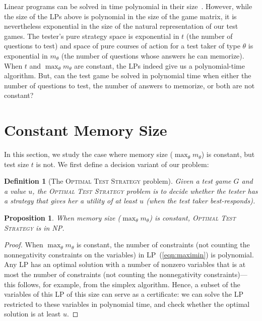 \documentclass{article}
\newtheorem{definition}{Definition}
\newtheorem{proposition}{Proposition}
\begin{document}
Linear programs can be solved in time polynomial in their
size~\cite{Khachiyan79}.
However, while the size of the LPs above is polynomial in the size of the
game matrix, it is nevertheless exponential in the size of the natural
representation of our test games.
The tester's pure strategy space is exponential in $t$ (the number of
questions to test) and space of pure courses of action for a test taker of
type $\theta$ is exponential in $m_\theta$ (the number of questions whose
answers he can memorize).  When $t$ and $\max_\theta m_\theta$ are constant, the LPs indeed
give us a polynomial-time algorithm.
But, can the test game be solved in polynomial time when either the number
of questions to test, the number of answers to memorize, or both are not
constant?

\section{Constant Memory Size}

In this section, we study the case where memory size ($\max_\theta
m_\theta$) is constant, but test size $t$ is not.
We first define a decision variant of our problem:

\begin{definition}[The \textsc{Optimal Test Strategy} problem]
Given a test game $G$ and a value $u$, the \textsc{Optimal Test Strategy}
problem is to decide whether the tester has a strategy that gives her
a utility of at least $u$ (when the test taker best-responds).
\end{definition}

\begin{proposition}
  When memory size ($\max_\theta m_\theta$) is constant, \textsc{Optimal
    Test Strategy} is in NP.
\label{prop:inNP}
\end{proposition}
\begin{proof}
  When $\max_\theta m_\theta$ is constant, the number of constraints (not
  counting the nonnegativity constraints on the variables) in
  LP~(\ref{eqn:maximin}) is polynomial.  Any LP has an optimal solution
  with a number of nonzero variables that is at most the number of
  constraints (not counting the nonnegativity constraints)---this follows,
  for example, from the simplex algorithm.  Hence, a subset of the
  variables of this LP of this size can serve as a certificate: we can
  solve the LP restricted to these variables in polynomial time, and check
  whether the optimal solution is at least $u$.
\end{proof}
\end{document}
